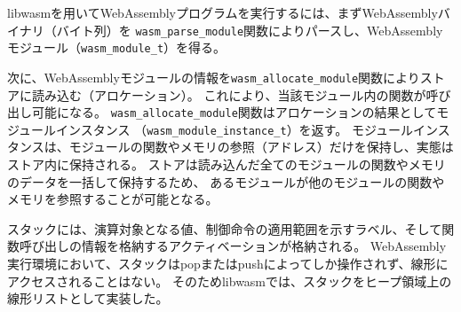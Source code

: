 libwasmを用いてWebAssemblyプログラムを実行するには、まずWebAssemblyバイナリ（バイト列）を
\verb|wasm_parse_module|関数によりパースし、WebAssemblyモジュール（\verb|wasm_module_t|）を得る。

次に、WebAssemblyモジュールの情報を\verb|wasm_allocate_module|関数によりストアに読み込む（アロケーション）。
これにより、当該モジュール内の関数が呼び出し可能になる。
\verb|wasm_allocate_module|関数はアロケーションの結果としてモジュールインスタンス
（\verb|wasm_module_instance_t|）を返す。
モジュールインスタンスは、モジュールの関数やメモリの参照（アドレス）だけを保持し、実態はストア内に保持される。
ストアは読み込んだ全てのモジュールの関数やメモリのデータを一括して保持するため、
あるモジュールが他のモジュールの関数やメモリを参照することが可能となる。

スタックには、演算対象となる値、制御命令の適用範囲を示すラベル、そして関数呼び出しの情報を格納するアクティベーションが格納される。
WebAssembly実行環境において、スタックはpopまたはpushによってしか操作されず、線形にアクセスされることはない。
そのためlibwasmでは、スタックをヒープ領域上の線形リストとして実装した。
